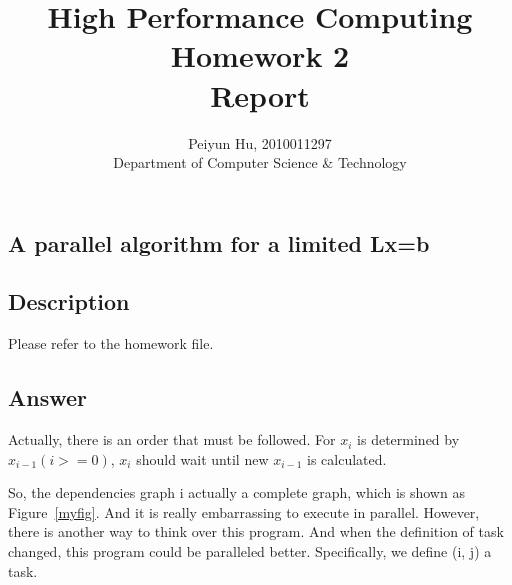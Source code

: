 \documentclass[a4paper]{article}   %
\begin{document}
\begin{CJK}{UTF8}{gbsn}
\begin{spacing}{1.2}

\title{High Performance Computing\\ Homework 2\\ Report}
\author{Peiyun Hu, 2010011297\\ Department of Computer Science \& Technology}
\maketitle

\section{A parallel algorithm for a limited Lx=b}
\subsection{Description}
Please refer to the homework file. 
\subsection{Answer}
%
%
Actually, there is an order that must be followed. For $x_i$ is determined by $x_{i-1} (i>=0) $, $x_i$ should wait until new $x_{i-1}$ is calculated. 



So, the dependencies graph i actually a complete graph, which is shown as Figure~\ref{myfig}. And it is really embarrassing to execute in parallel. However, there is another way to think over this program. And when the definition of task changed, this program could be paralleled better. Specifically, we define (i, j) a task.


\end{spacing}
\end{CJK}
\end{document}
